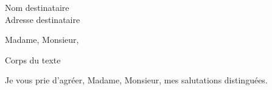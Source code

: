 \documentclass[12pt]{lettre}
\begin{document}
\begin{letter}{Nom destinataire\\Adresse destinataire}
\address{Louis Plissonneau\\
Bât. B$^\prime$, Les Allées du Prince\\
260, chemin des Combes\\
06600 Antibes}
\nofax
\signature{Louis Plissonneau}
\opening{Madame, Monsieur,}
  Corps du texte
\closing{Je vous prie d'agréer,
Madame, Monsieur,
mes salutations distinguées.}
 
\end{letter}
\end{document}
